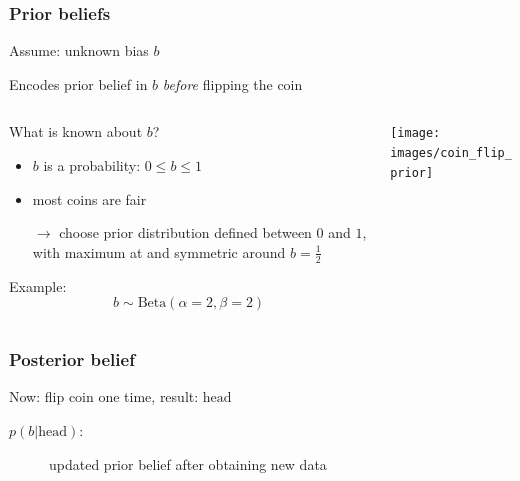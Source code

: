 \documentclass[t,aspectratio=169]{beamer}
\begin{document}
\begin{frame}
  \frametitle{Prior beliefs}
  Assume: unknown bias $b$
  \begin{tcolorbox}[title=Prior probability]
    Encodes prior belief in $b$ \textit{before} flipping the coin
  \end{tcolorbox}
  \begin{columns}[onlytextwidth]
    \begin{column}{0.45\textwidth}
      What is known about $b$?
      \begin{itemize}
      \item $b$ is a probability: $0 \leq b \leq 1$
      \item most coins are fair
      \end{itemize}
      \begin{itemize}
      \item[$\rightarrow$] choose prior distribution defined between $0$ and $1$, with maximum at and symmetric around $b=\frac{1}{2}$
      \end{itemize}
      Example:
      \begin{equation*}
        b \sim \mathrm{Beta}(\alpha=2,\beta=2)
      \end{equation*}
    \end{column}
    \begin{column}[T]{0.45\textwidth}
      \begin{adjustbox}{width=\textwidth}
        \texttt{[image: images/coin\_flip\_prior]}
      \end{adjustbox}
    \end{column}
  \end{columns}
\end{frame}


\begin{frame}
  \frametitle{Posterior belief}
  Now: flip coin one time, result: $\mathrm{head}$
  \begin{tcolorbox}[title=Posterior belief]
    \begin{description}
      \item[$p(b|\mathrm{head})$:] updated prior belief after obtaining new data
    \end{description}
  \end{tcolorbox}
  \vfill
  \centering
\end{frame}
\end{document}

